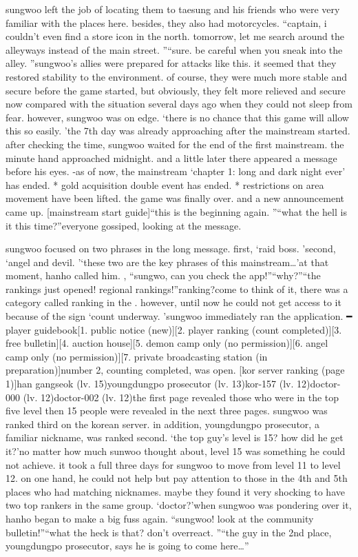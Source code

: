 sungwoo left the job of locating them to taesung and his friends who were very familiar with the places here.
 besides, they also had motorcycles.
“captain, i couldn’t even find a store icon in the north.
 tomorrow, let me search around the alleyways instead of the main street.
”“sure.
 be careful when you sneak into the alley.
”sungwoo’s allies were prepared for attacks like this.
 it seemed that they restored stability to the environment.
 of course, they were much more stable and secure before the game started, but obviously, they felt more relieved and secure now compared with the situation several days ago when they could not sleep from fear.
however, sungwoo was on edge.
‘there is no chance that this game will allow this so easily.
’the 7th day was already approaching after the mainstream started.
after checking the time, sungwoo waited for the end of the first mainstream.
 the minute hand approached midnight.
and a little later there appeared a message before his eyes.
-as of now, the mainstream ‘chapter 1: long and dark night ever’ has ended.
* gold acquisition double event has ended.
* restrictions on area movement have been lifted.
the game was finally over.
and a new announcement came up.
[mainstream start guide]“this is the beginning again.
”“what the hell is it this time?”everyone gossiped, looking at the message.

sungwoo focused on two phrases in the long message.
first, ‘raid boss.
’second, ‘angel and devil.
’‘these two are the key phrases of this mainstream…’at that moment, hanho called him.
, “sungwo, can you check the app!”“why?”“the rankings just opened! regional rankings!”ranking?come to think of it, there was a category called ranking in the .
however, until now he could not get access to it because of the sign ‘count underway.
’sungwoo immediately ran the application.
━ player guidebook[1.
 public notice (new)][2.
 player ranking (count completed)][3.
 free bulletin][4.
 auction house][5.
 demon camp only (no permission)][6.
 angel camp only (no permission)][7.
 private broadcasting station (in preparation)]number 2, counting completed, was open.
[kor server ranking (page 1)]han gangseok (lv.
 15)youngdungpo prosecutor (lv.
 13)kor-157 (lv.
 12)doctor-000 (lv.
 12)doctor-002 (lv.
 12)the first page revealed those who were in the top five level then 15 people were revealed in the next three pages.
sungwoo was ranked third on the korean server.
 in addition, youngdungpo prosecutor, a familiar nickname, was ranked second.
‘the top guy’s level is 15? how did he get it?’no matter how much sunwoo thought about, level 15 was something he could not achieve.
it took a full three days for sungwoo to move from level 11 to level 12.
on one hand, he could not help but pay attention to those in the 4th and 5th places who had matching nicknames.
 maybe they found it very shocking to have two top rankers in the same group.
‘doctor?’when sungwoo was pondering over it, hanho began to make a big fuss again.
“sungwoo! look at the community bulletin!”“what the heck is that? don’t overreact.
”“the guy in the 2nd place, youngdungpo prosecutor, says he is going to come here…”

